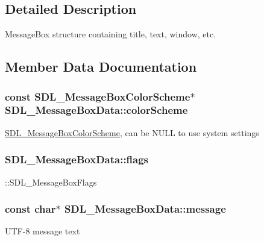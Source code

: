 \subsection{Detailed Description}
Message\+Box structure containing title, text, window, etc. 

\subsection{Member Data Documentation}
\hypertarget{struct_s_d_l___message_box_data_a18744865a3e89e260db5f01aee579e35}{}
\subsubsection[{color\+Scheme}]{\setlength{\rightskip}{0pt plus 5cm}const {\bf S\+D\+L\+\_\+\+Message\+Box\+Color\+Scheme}$\ast$ S\+D\+L\+\_\+\+Message\+Box\+Data\+::color\+Scheme}\label{struct_s_d_l___message_box_data_a18744865a3e89e260db5f01aee579e35}
\hyperlink{struct_s_d_l___message_box_color_scheme}{S\+D\+L\+\_\+\+Message\+Box\+Color\+Scheme}, can be N\+U\+L\+L to use system settings \hypertarget{struct_s_d_l___message_box_data_a113d016f760bf4e4156b0f376358d6a0}{}
\subsubsection[{flags}]{ S\+D\+L\+\_\+\+Message\+Box\+Data\+::flags}\label{struct_s_d_l___message_box_data_a113d016f760bf4e4156b0f376358d6a0}
\+::\+S\+D\+L\+\_\+\+Message\+Box\+Flags \hypertarget{struct_s_d_l___message_box_data_ada6ae208a1f85adabbd7a7a08ca609c8}{}
\subsubsection[{message}]{\setlength{\rightskip}{0pt plus 5cm}const char$\ast$ S\+D\+L\+\_\+\+Message\+Box\+Data\+::message}\label{struct_s_d_l___message_box_data_ada6ae208a1f85adabbd7a7a08ca609c8}
U\+T\+F-\/8 message text \hypertarget{struct_s_d_l___message_box_data_a93ceeafeed20b553ad4c86c9be37f117}{}

